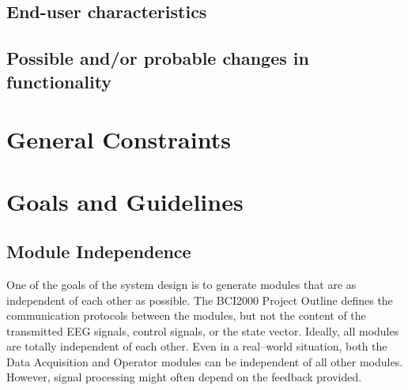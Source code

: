 \subsection{End-user characteristics}
\subsection{Possible and/or probable changes in functionality}

     
\section{General Constraints}


     
 
\section{Goals and Guidelines}
\label{des_consid_goals}

\subsection{Module Independence}
\label{goals_module_independence}

One of the goals of the system design is to generate modules that are as 
independent of each other as possible. The BCI2000 Project Outline defines the 
communication protocols between the modules, but not the content of the 
transmitted EEG signals, control signals, or the state vector. Ideally, all 
modules are totally independent of each other. Even in a real--world situation, 
both the Data Acquisition and Operator modules can be independent of all other 
modules. However, signal processing might often depend on the feedback provided. 

